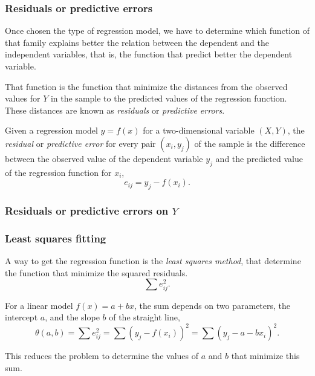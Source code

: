 \begin{frame}
\frametitle{Residuals or predictive errors}
Once chosen the type of regression model, we have to determine which function of that family explains better the
relation between the dependent and the independent variables, that is, the function that predict better the
dependent variable. 

That function is the function that minimize the distances from the observed values for $Y$ in the sample to the
predicted values of the regression function.
These distances are known as \emph{residuals} or \emph{predictive errors}.

\begin{definition}
Given a regression model $y=f(x)$ for a two-dimensional variable $(X,Y)$, the \emph{residual} or \emph{predictive error}
for every pair $(x_i,y_j)$ of the sample is the difference between the observed value of the dependent variable $y_j$
and the predicted value of the regression function for $x_i$,
\[
e_{ij} = y_j-f(x_i).
\]
\end{definition}
\end{frame}


\begin{frame}
\frametitle{Residuals or predictive errors on $Y$}
\bigskip\bigskip

\centering
\resizebox{0.9\textwidth}{!}{}
\end{frame}


\begin{frame}
\frametitle{Least squares fitting}
A way to get the regression function is the \emph{least squares method}, that determine the function that minimize the
squared residuals.
\[
\sum e_{ij}^2.
\]

For a linear model $f(x) = a + bx$, the sum depends on two parameters, the intercept $a$, and the slope $b$ of the
straight line,
\[
\theta(a,b) = \sum e_{ij}^2 =\sum (y_j - f(x_i))^2 =\sum (y_j-a-bx_i)^2.
\]

This reduces the problem to determine the values of $a$ and $b$ that minimize this sum. 
\end{frame}


